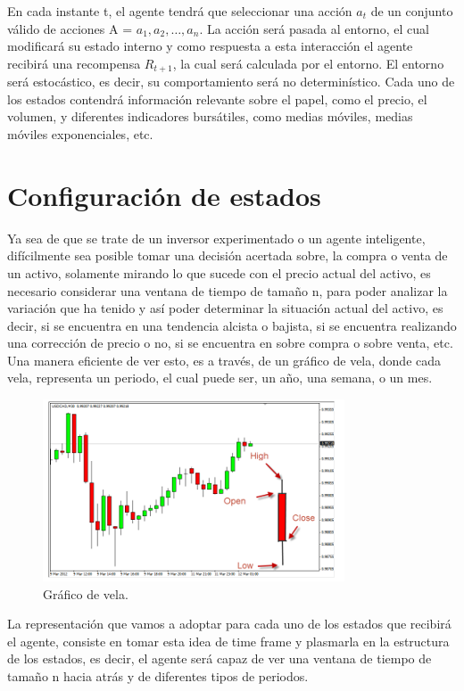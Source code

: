 En cada instante t, el agente tendrá que seleccionar una acción $a_t$  de un conjunto válido de acciones A = {$a_1, a_2, …, a_n$}. La acción será pasada al entorno, el cual modificará su estado interno y como respuesta a esta interacción el agente recibirá una recompensa $R_{t + 1}$, la cual será calculada por el entorno. El entorno será estocástico, es decir, su comportamiento será no determinístico. Cada uno de los estados contendrá información relevante sobre el papel, como el precio, el volumen, y diferentes indicadores bursátiles, como medias móviles, medias móviles exponenciales, etc.

\section{Configuración de estados}

Ya sea de que se trate de un inversor experimentado o un agente inteligente, difícilmente sea posible tomar una decisión acertada sobre, la compra o venta de un activo, solamente mirando lo que sucede con el precio actual 
del activo, es necesario considerar una ventana de tiempo de tamaño n, para poder analizar la variación que ha tenido y así poder determinar la situación actual del activo, es decir, si se encuentra en una tendencia
alcista o bajista, si se encuentra realizando una corrección de precio o no, si se encuentra en sobre compra o sobre venta, etc. Una manera eficiente de ver esto, es a través, de un gráfico de vela, donde cada vela, representa un periodo, el cual puede ser, un año, una semana, o un mes.

\begin{figure}[h!]
	\centering
	\includegraphics[scale=0.75]{imagenes/candleChart.png}
	\caption{Gráfico de vela.}
\end{figure}

La representación que vamos a adoptar para cada uno de los estados que recibirá el agente, consiste en tomar esta idea de time frame y plasmarla en la estructura de los estados, es decir, el agente será capaz de ver una ventana de tiempo de tamaño n hacia atrás y de diferentes tipos de periodos.

